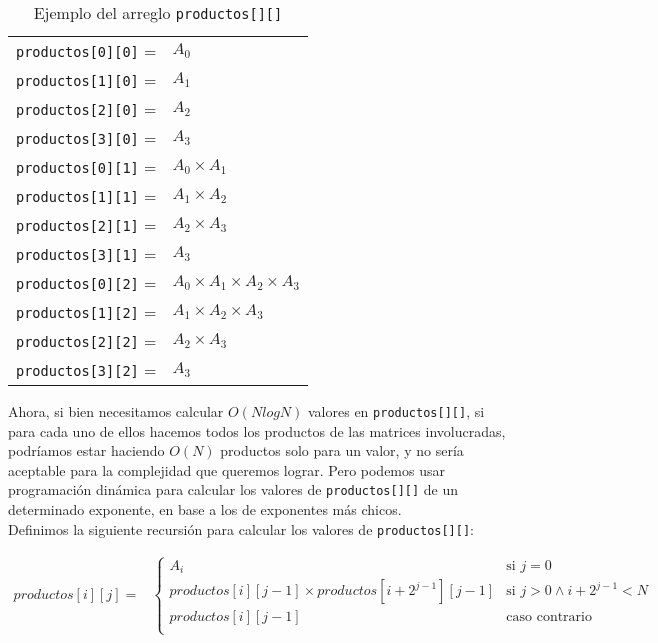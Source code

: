 \begin{table}[h!]
\begin{center}
\begin{tabular}{l l}
\texttt{productos[0][0]} = &$A_0$\\
\texttt{productos[1][0]} = &$A_1$\\
\texttt{productos[2][0]} = &$A_2$\\
\texttt{productos[3][0]} = &$A_3$\\
\texttt{productos[0][1]} = &$A_0 \times A_1$\\
\texttt{productos[1][1]} = &$A_1 \times A_2$\\
\texttt{productos[2][1]} = &$A_2 \times A_3$\\
\texttt{productos[3][1]} = &$A_3$\\
\texttt{productos[0][2]} = &$A_0 \times A_1 \times A_2 \times A_3$\\
\texttt{productos[1][2]} = &$A_1 \times A_2 \times A_3$\\
\texttt{productos[2][2]} = &$A_2 \times A_3$\\
\texttt{productos[3][2]} = &$A_3$
\end{tabular}
\end{center}
\caption{Ejemplo del arreglo \texttt{productos[][]}}
\end{table}

Ahora, si bien necesitamos calcular $O(N log N)$ valores en \texttt{productos[][]}, 
si para cada uno de ellos hacemos todos los productos de las matrices involucradas, 
podríamos estar haciendo $O(N)$ productos solo para un valor, y no sería aceptable 
para la complejidad que queremos lograr. Pero podemos usar programación dinámica para 
calcular los valores de \texttt{productos[][]} de un determinado exponente, en base 
a los de exponentes más chicos.\\

Definimos la siguiente recursión para calcular los valores de \texttt{productos[][]}: 

\begin{align*}
productos[i][j] =
	&\begin{cases}
		A_i & \text{si $j=0$} \\
		productos[i][j-1] \times productos[i+2^{j-1}][j-1] & \text{si $j>0 \wedge i+2^{j-1}<N$} \\
		productos[i][j-1] & \text{caso contrario} \\
	\end{cases} \\
\end{align*}

